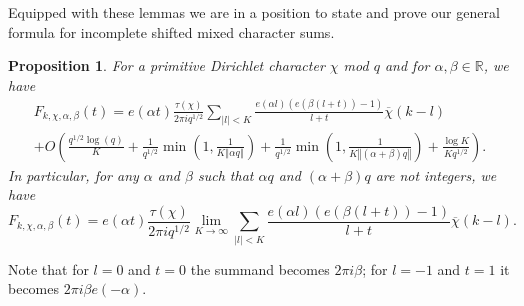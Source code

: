 \documentclass[12pt, a4paper]{amsart}
\newtheorem{proposition}{Proposition}
\theoremstyle{remark}
\newcommand{\R}{\ensuremath{\mathbb{R}}}
\newcommand{\abs}[1]{\left|#1\right|}
\newcommand{\frcmod}[1]{\left\Vert#1\right\Vert}
\newcommand{\chibar}{\overline \chi}
\begin{document}
Equipped with these lemmas we are in a position to state and prove our general
formula for incomplete shifted mixed character sums.

\begin{proposition}\label{prop:poisson}
    For a primitive Dirichlet character $\chi$ mod $q$ and for $\alpha,\beta \in \R$,
    we have
\begin{multline*}
    F_{k,\chi,\alpha,\beta}(t)
    = e(\alpha t)\frac{\tau(\chi)}{2\pi i q^{1/2}}\sum_{\abs{l} < K}
    \frac{e(\alpha l) (e(\beta(l + t)) - 1)}
    {l + t }
    \chibar(k-l)
    \\
    +
    O\left(\frac{q^{1/2} \log(q)}{K} + \frac{1}{q^{1/2}}\min\left(1, \frac{1}{K \frcmod{\alpha q}}\right)
        + \frac{1}{q^{1/2}}\min\left(1, \frac{1}{K\frcmod{(\alpha + \beta)q}}\right)
    + \frac{\log K}{Kq^{1/2}}
    \right).
\end{multline*}
    In particular, for any $\alpha$ and $\beta$ such that $\alpha q$ and
    $(\alpha + \beta)q$ are not integers, we have
    \begin{equation}\label{elegant_formula}
    F_{k,\chi,\alpha,\beta}(t) =
    e(\alpha t)\frac{\tau(\chi)}{2\pi i q^{1/2}}
    \lim_{K \rightarrow \infty}
    \sum_{\abs{l} < K}
    \frac{e(\alpha l) (e(\beta(l + t)) - 1)}
    {l + t }
    \chibar(k-l).
\end{equation}
\end{proposition}
Note that for $l=0$ and $t=0$ the summand becomes $2\pi i \beta$; for
$l=-1$ and $t=1$ it becomes $2 \pi i \beta e(-\alpha)$.
\end{document}
